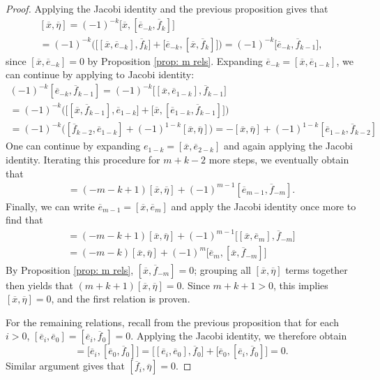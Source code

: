 \documentclass[11pt,letterpaper]{amsart}
\numberwithin{equation}{section}
\newcommand{\oline}{\overline}
\begin{document}
\begin{proof}
    Applying the Jacobi identity and the previous proposition gives that
    \begin{gather}
        \label{x, eta 1}
        [\oline x,\oline \eta] = (-1)^{-k}\big[\oline x,[\oline e_{-k},\oline f_{k}]\big] 
        \\
        = (-1)^{-k}\Big(\big[[\oline x, \oline e_{-k}], \oline f_k\big] + \big[\oline e_{-k},[\oline x, \oline f_{k}]\big]\Big) = (-1)^{-k}\big[\oline e_{-k},\oline f_{k-1}\big],
    \end{gather}
    since $[\oline x, \oline e_{-k}]=0$ by Proposition \ref{prop: m rels}. Expanding $\oline e_{-k} = [\oline x , \oline e_{1-k}]$, we can continue by applying to Jacobi identity:
    \begin{gather}
        (-1)^{-k}[\oline e_{-k},\oline f_{k-1}] =  (-1)^{-k}\big[[\oline x, \oline e_{1-k}],\oline f_{k-1}\big] 
        \\
        = (-1)^{-k}\Big(\big[[\oline x, \oline f_{k-1}],\oline e_{1-k}\big]+\big[\oline x,[\oline e_{1-k},\oline f_{k-1}]\big]\Big)
        \\
        = (-1)^{-k}\Big( [\oline f_{k-2}, \oline e_{1-k}]+ (-1)^{1-k}[\oline x,\oline \eta]\Big) = -[\oline x, \oline \eta] + (-1)^{1-k}[\oline e_{1-k},\oline f_{k-2}]
    \end{gather}
    One can continue by expanding $e_{1-k} = [\oline x ,\oline e_{2-k}]$ and again applying the Jacobi identity. Iterating this procedure for $m+k-2$ more steps, we eventually obtain that
    \begin{gather}
        [\oline x,\oline \eta] = (-m-k+1)[\oline x,\oline \eta] + (-1)^{m-1}[\oline{e}_{m-1},\oline f_{-m}].
    \end{gather}
    Finally, we can write $\oline e_{m-1} = [\oline x, \oline e_{m}]$ and apply the Jacobi identity once more to find that
    \begin{gather}
        [\oline x,\oline \eta] = (-m-k+1)[\oline x,\oline \eta] + (-1)^{m-1}\big[[\oline x, \oline{e}_{m}],\oline f_{-m}\big] \\
        = (-m-k)[\oline x , \oline \eta]+ (-1)^{m}\big[\oline e_m,[\oline x, \oline f_{-m}]\big]
    \end{gather}
    By Proposition \ref{prop: m rels}, $[\oline x, \oline f_{-m}] = 0$; grouping all $[\oline x,\oline \eta]$ terms together then yields that $(m+k+1)[\oline x,\oline \eta] = 0$. Since $m+k+1> 0$, this implies $[\oline x,\oline \eta] = 0$, and the first relation is proven. 

    For the remaining relations, recall from the previous proposition that for each $i>0$, $[\oline e_i,\oline e_0] = [\oline e_i, \oline f_0] = 0$. Applying the Jacobi identity, we therefore obtain
    \begin{equation}
        [\oline e_i, \oline \eta] = \big[\oline e_i, [\oline e_0,\oline f_0]\big] = \big[[\oline e_i,\oline e_0],\oline f_0\big] + \big[\oline e_0, [\oline e_i, \oline f_0]\big] = 0.
    \end{equation}
    Similar argument gives that $[\oline f_i, \oline \eta]=0$.
\end{proof}
\end{document}
